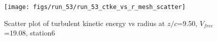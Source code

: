 \begin{figure}[H]
\centering
\texttt{[image: figs/run\_53/run\_53\_ctke\_vs\_r\_mesh\_scatter]}
\caption{Scatter plot of turbulent kinetic energy vs radius at $z/c$=9.50, $V_{free}$=19.08, station6}
\label{fig:run_53_ctke_vs_r_mesh_scatter}
\end{figure}


